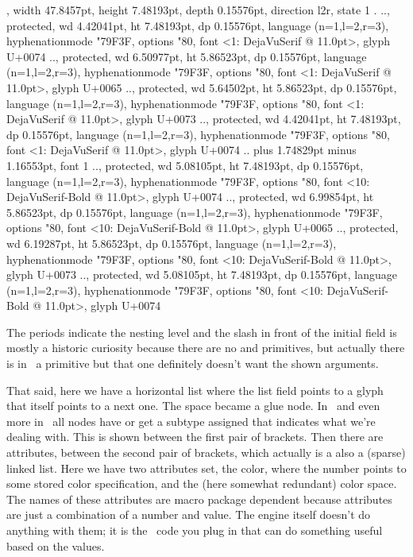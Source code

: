 \starttyping[style=small,align=hangright]
\hlist[box][color=1,colormodel=1,mathintervals=1], width 47.8457pt, height 7.48193pt, depth 0.15576pt, direction l2r, state 1
.\list
..\glyph[unset][color=1,colormodel=1], protected, wd 4.42041pt, ht 7.48193pt, dp 0.15576pt, language (n=1,l=2,r=3), hyphenationmode "79F3F, options "80, font <1: DejaVuSerif @ 11.0pt>, glyph U+0074
..\glyph[unset][color=1,colormodel=1], protected, wd 6.50977pt, ht 5.86523pt, dp 0.15576pt, language (n=1,l=2,r=3), hyphenationmode "79F3F, options "80, font <1: DejaVuSerif @ 11.0pt>, glyph U+0065
..\glyph[unset][color=1,colormodel=1], protected, wd 5.64502pt, ht 5.86523pt, dp 0.15576pt, language (n=1,l=2,r=3), hyphenationmode "79F3F, options "80, font <1: DejaVuSerif @ 11.0pt>, glyph U+0073
..\glyph[unset][color=1,colormodel=1], protected, wd 4.42041pt, ht 7.48193pt, dp 0.15576pt, language (n=1,l=2,r=3), hyphenationmode "79F3F, options "80, font <1: DejaVuSerif @ 11.0pt>, glyph U+0074
..\glue[spaceskip][color=1,colormodel=1] 3.49658pt plus 1.74829pt minus 1.16553pt, font 1
..\glyph[unset][color=1,colormodel=1], protected, wd 5.08105pt, ht 7.48193pt, dp 0.15576pt, language (n=1,l=2,r=3), hyphenationmode "79F3F, options "80, font <10: DejaVuSerif-Bold @ 11.0pt>, glyph U+0074
..\glyph[unset][color=1,colormodel=1], protected, wd 6.99854pt, ht 5.86523pt, dp 0.15576pt, language (n=1,l=2,r=3), hyphenationmode "79F3F, options "80, font <10: DejaVuSerif-Bold @ 11.0pt>, glyph U+0065
..\glyph[unset][color=1,colormodel=1], protected, wd 6.19287pt, ht 5.86523pt, dp 0.15576pt, language (n=1,l=2,r=3), hyphenationmode "79F3F, options "80, font <10: DejaVuSerif-Bold @ 11.0pt>, glyph U+0073
..\glyph[unset][color=1,colormodel=1], protected, wd 5.08105pt, ht 7.48193pt, dp 0.15576pt, language (n=1,l=2,r=3), hyphenationmode "79F3F, options "80, font <10: DejaVuSerif-Bold @ 11.0pt>, glyph U+0074
\stoptyping

The periods indicate the nesting level and the slash in front of the initial
field is mostly a historic curiosity because there are no \type {\hlist} and
\type {\glue} primitives, but actually there is in \LUAMETATEX\ a \type {\glyph}
primitive but that one definitely doesn't want the shown arguments.

That said, here we have a horizontal list where the list field points to a glyph
that itself points to a next one. The space became a glue node. In \LUATEX\ and
even more in \LUAMETATEX\ all nodes have or get a subtype assigned that indicates
what we're dealing with. This is shown between the first pair of brackets. Then
there are attributes, between the second pair of brackets, which actually is a
also a (sparse) linked list. Here we have two attributes set, the color, where
the number points to some stored color specification, and the (here somewhat
redundant) color space. The names of these attributes are macro package dependent
because attributes are just a combination of a number and value. The engine
itself doesn't do anything with them; it is the \LUA\ code you plug in that can
do something useful based on the values.

